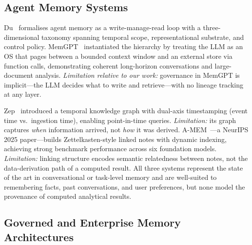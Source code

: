 \documentclass[9pt,twocolumn,twoside]{extarticle}
\begin{document}
\subsection{Agent Memory Systems}

Du~\cite{du2026survey} formalises agent memory as a write-manage-read loop
with a three-dimensional taxonomy spanning temporal scope, representational
substrate, and control policy.
MemGPT~\cite{packer2023memgpt} instantiated the hierarchy by treating the LLM
as an OS that pages between a bounded context window and an external store via
function calls, demonstrating coherent long-horizon conversations and
large-document analysis.
\emph{Limitation relative to our work:} governance in MemGPT is implicit---the
LLM decides what to write and retrieve---with no lineage tracking at any layer.

Zep~\cite{rasmussen2025zep} introduced a temporal knowledge graph with dual-axis
timestamping (event time vs.\ ingestion time), enabling point-in-time queries.
\emph{Limitation:} its graph captures \emph{when} information arrived, not
\emph{how} it was derived.
A-MEM~\cite{xu2025amem}---a NeurIPS 2025 paper---builds Zettelkasten-style
linked notes with dynamic indexing, achieving strong benchmark performance across
six foundation models.
\emph{Limitation:} linking structure encodes semantic relatedness between notes,
not the data-derivation path of a computed result.
All three systems represent the state of the art in conversational or
task-level memory and are well-suited to remembering facts, past
conversations, and user preferences, but none model the provenance of
computed analytical results.

\subsection{Governed and Enterprise Memory Architectures}
\end{document}
